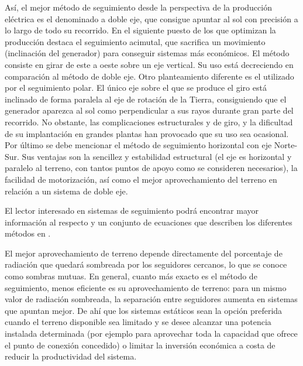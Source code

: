 Así, el mejor método de seguimiento desde la perspectiva de la producción
eléctrica es el denominado a doble eje, que consigue apuntar al sol
con precisión a lo largo de todo su recorrido. En el siguiente puesto
de los que optimizan la producción destaca el seguimiento acimutal,
que sacrifica un movimiento (inclinación del generador) para conseguir
sistemas más económicos. El método consiste en girar de este a oeste
sobre un eje vertical. Su uso está decreciendo en comparación al método
de doble eje. Otro planteamiento diferente es el utilizado por el
seguimiento polar. El único eje sobre el que se produce el giro está
inclinado de forma paralela al eje de rotación de la Tierra, consiguiendo
que el generador aparezca al sol como perpendicular a sus rayos durante
gran parte del recorrido. No obstante, las complicaciones estructurales
y de giro, y la dificultad de su implantación en grandes plantas han
provocado que su uso sea ocasional. Por último se debe mencionar el
método de seguimiento horizontal con eje Norte-Sur. Sus ventajas son
la sencillez y estabilidad estructural (el eje es horizontal y paralelo
al terreno, con tantos puntos de apoyo como se consideren necesarios),
la facilidad de motorización, así como el mejor aprovechamiento del
terreno en relación a un sistema de doble eje.

El lector interesado en sistemas de seguimiento podrá encontrar mayor
información al respecto y un conjunto de ecuaciones que describen
los diferentes métodos en \cite{Perpinan2008}. 

El mejor aprovechamiento de terreno depende directamente del porcentaje
de radiación que quedará sombreada por los seguidores cercanos, lo
que se conoce como sombras mutuas. En general, cuanto más exacto es
el método de seguimiento, menos eficiente es su aprovechamiento de
terreno: para un mismo valor de radiación sombreada, la separación
entre seguidores aumenta en sistemas que apuntan mejor. De ahí que
los sistemas estáticos sean la opción preferida cuando el terreno
disponible sea limitado y se desee alcanzar una potencia instalada
determinada (por ejemplo para aprovechar toda la capacidad que ofrece
el punto de conexión concedido) o limitar la inversión económica a
costa de reducir la productividad del sistema.

